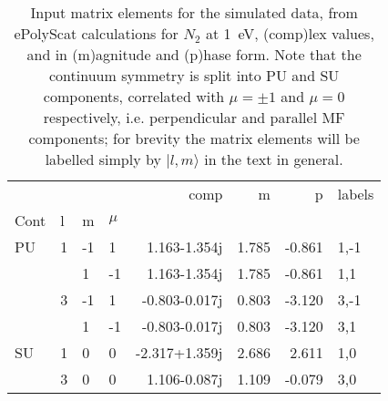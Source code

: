 \documentclass[10pt]{article}
\begin{document}











\begin{table}

\begin{tabular}{llllrrrl}
\toprule
   &   &    &    &          comp &     m &      p & labels \\
Cont & l & m & $\mu$ &               &       &        &        \\
\midrule
PU & 1 & -1 &  1 &  1.163-1.354j & 1.785 & -0.861 &   1,-1 \\
   &   &  1 & -1 &  1.163-1.354j & 1.785 & -0.861 &    1,1 \\
   & 3 & -1 &  1 & -0.803-0.017j & 0.803 & -3.120 &   3,-1 \\
   &   &  1 & -1 & -0.803-0.017j & 0.803 & -3.120 &    3,1 \\
SU & 1 &  0 &  0 & -2.317+1.359j & 2.686 &  2.611 &    1,0 \\
   & 3 &  0 &  0 &  1.106-0.087j & 1.109 & -0.079 &    3,0 \\
\bottomrule
\end{tabular}

\caption{{\label{tab:inputMatE}Input matrix elements for the simulated data, from ePolyScat calculations for $N_2$ at 1~eV, (comp)lex values, and in (m)agnitude and (p)hase form. Note that the continuum symmetry is split into PU and SU components, correlated with $\mu=\pm1$ and $\mu=0$ respectively, i.e. perpendicular and parallel MF components; for brevity the matrix elements will be labelled simply by $|l,m\rangle$ in the text in general.}}
\end{table}
\end{document}
